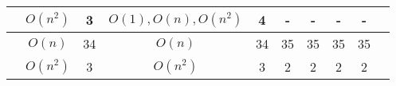 \begin{table}[ht]
{\begin{tabular}{ >{\scriptsize}c | >{\scriptsize}c | >{\scriptsize}c | >{\scriptsize}c | c | c | c | c | c | c }
        \cline{2-9}
        & $O(n^2)$     & 3     &  $O(1), O(n), O(n^2)$ & 4 & - & - & - & - \\
        \hline \hline
        \multirow{3}{*}{Tianhan} 
        & $O(n)$       & 34     & $O(n) $ & 34 & 35 & 35 & 35 & 35 \\
        \cline{2-9}
        & $O(n^2)$      & 3    &  $O(n^2)$  & 3 & 2 & 2 & 2 & 2 \\
        \hline
        \end{tabular}
        }
        \vspace{-1cm}
    \end{table}
    